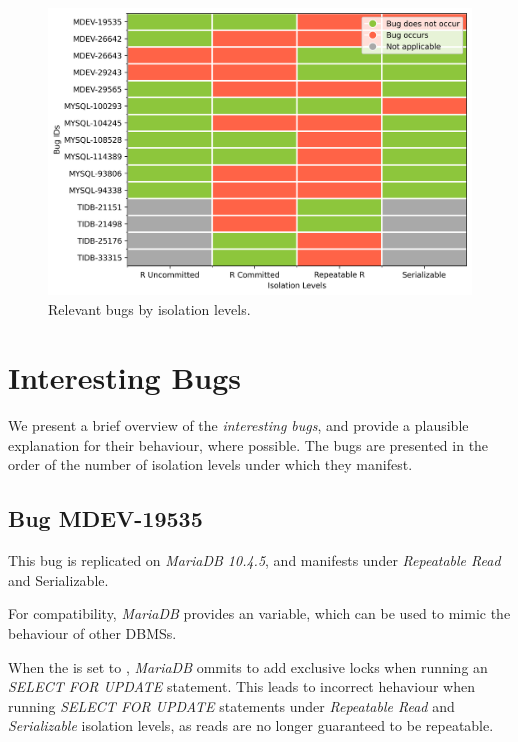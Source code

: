 \begin{figure}
    \centering
    \includegraphics[width=0.9\linewidth]{assets/bug_replication_interesting_bugs_by_isolation_lvl.png}
    \caption{Relevant bugs by isolation levels.}
    \label{fig:interesting_bugs_by_isolation_lvl}
\end{figure}

\section{Interesting Bugs}

We present a brief overview of the \textit{interesting bugs}, and provide a plausible explanation for their behaviour, where possible. The bugs are presented in the order of the number of isolation levels under which they manifest.

\subsection*{Bug MDEV-19535}

This bug is replicated on \textit{MariaDB 10.4.5}, and manifests under \textit{Repeatable Read} and {Serializable}.

For compatibility, \textit{MariaDB} provides an  variable, which can be used to mimic the behaviour of other DBMSs.

When the  is set to , \textit{MariaDB} ommits to add exclusive locks when running an \textit{SELECT FOR UPDATE} statement. This leads to incorrect hehaviour when running \textit{SELECT FOR UPDATE} statements under \textit{Repeatable Read} and \textit{Serializable} isolation levels, as reads are no longer guaranteed to be repeatable.

